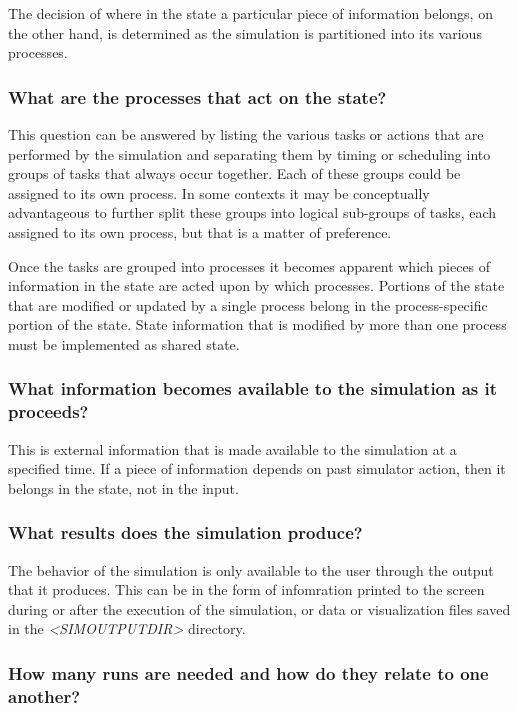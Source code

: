 \documentclass[12pt]{article}
\newcommand{\simoutputdir}[1]{\textsf{\textsl{{\relsize{-1.0}\textless{}\mbox{SIMOUTPUTDIR}\textgreater{}}}}\code{{#1}}}
\newcommand{\code}[1]{{\relsize{-0.5}{\tt{{#1}}}}}  %
\numberwithin{equation}{section}
\numberwithin{table}{section}
\numberwithin{figure}{section}
\begin{document}
The decision of where in the state a particular piece of information belongs, on the other hand, is determined as the simulation is partitioned into its various processes.

\subsubsection{What are the processes that act on the state?}

This question can be answered by listing the various tasks or actions that are performed by the simulation and separating them by timing or scheduling into groups of tasks that always occur together. Each of these groups could be assigned to its own process. In some contexts it may be conceptually advantageous to further split these groups into logical sub-groups of tasks, each assigned to its own process, but that is a matter of preference.

Once the tasks are grouped into processes it becomes apparent which pieces of information in the state are acted upon by which processes. Portions of the state that are modified or updated by a single process belong in the process-specific portion of the state. State information that is modified by more than one process must be implemented as shared state.

\subsubsection{What information becomes available to the simulation as it proceeds?}

This is external information that is made available to the simulation at a specified time. If a piece of information depends on past simulator action, then it belongs in the state, not in the input.

\subsubsection{What results does the simulation produce?}

The behavior of the simulation is only available to the user through the output that it produces. This can be in the form of infomration printed to the screen during or after the execution of the simulation, or data or visualization files saved in the \simoutputdir{} directory.

\subsubsection{How many runs are needed and how do they relate to one another?}
\end{document}
